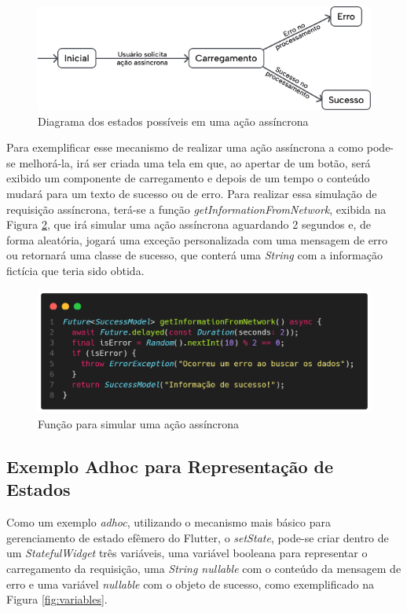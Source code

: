 \documentclass[12pt, %
openright, 
oneside, %
a4paper,    %
brazil]{facom-ufu-abntex2}
\begin{document}
\begin{figure}[ht]
    \centering
    \includegraphics[width=.6\textwidth]{figures/states/states_diagram.png}
    \caption{Diagrama dos estados possíveis em uma ação assíncrona}
    \label{fig:states_diagram}
\end{figure}

Para exemplificar esse mecanismo de realizar uma ação assíncrona a como pode-se melhorá-la, irá ser criada uma tela em que, ao apertar de um botão, será exibido um componente de carregamento e depois de um tempo o conteúdo mudará para um texto de sucesso ou de erro. Para realizar essa simulação de requisição assíncrona, terá-se a função \textit{getInformationFromNetwork}, exibida na Figura \ref{fig:simulate_request}, que irá simular uma ação assíncrona aguardando 2 segundos e, de forma aleatória, jogará uma exceção personalizada com uma mensagem de erro ou retornará uma classe de sucesso, que conterá uma \textit{String} com a informação fictícia que teria sido obtida.

\begin{figure}[ht]
    \centering
    \includegraphics[width=.65\textwidth, trim={0 30 0 100}, clip]{figures/states/getInformationFromNetwork.png}
    \caption{Função para simular uma ação assíncrona}
    \label{fig:simulate_request}
\end{figure}

\subsection{Exemplo Adhoc para Representação de Estados}

Como um exemplo \textit{adhoc}, utilizando o mecanismo mais básico para gerenciamento de estado efêmero do Flutter, o \textit{setState}, pode-se criar dentro de um \textit{StatefulWidget} três variáveis, uma variável booleana para representar o carregamento da requisição, uma \textit{String nullable} com o conteúdo da mensagem de erro e uma variável \textit{nullable} com o objeto de sucesso, como exemplificado na Figura \ref{fig:variables}.
\end{document}
